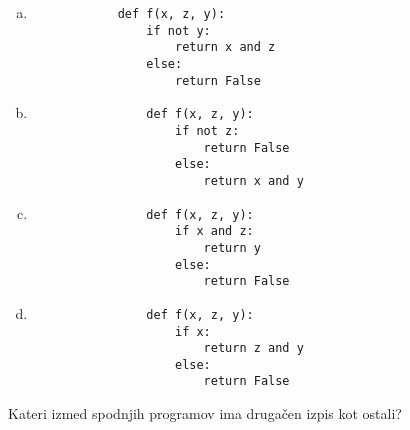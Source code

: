 \documentclass[arhiv, 10pt]{../izpit}
\begin{document}
        \begin{multicols}{2}
        \begin{enumerate}[(a)]
\item 
            \begin{verbatim}
            def f(x, z, y):
                if not y:
                    return x and z
                else:
                    return False
            \end{verbatim}
        
\item 
                \begin{verbatim}
                def f(x, z, y):
                    if not z:
                        return False
                    else:
                        return x and y
                \end{verbatim}
            
\item 
                \begin{verbatim}
                def f(x, z, y):
                    if x and z:
                        return y
                    else:
                        return False
                \end{verbatim}
            
\item 
                \begin{verbatim}
                def f(x, z, y):
                    if x:
                        return z and y
                    else:
                        return False
                \end{verbatim}
            
\end{enumerate}

        \end{multicols}
    
        \naloga*
        
        Kateri izmed spodnjih programov ima drugačen izpis kot ostali?
    
\end{document}
